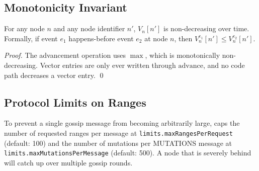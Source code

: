 \subsection{Monotonicity Invariant}

\begin{invariant}
\label{inv:mono-vv}
For any node $n$ and any node identifier $n'$, $V_n[n']$ is non-decreasing
over time. Formally, if event $e_1$ happens-before event $e_2$ at node $n$,
then $V_n^{e_1}[n'] \leq V_n^{e_2}[n']$.
\end{invariant}

\begin{proof}
The advancement operation uses $\max$, which is monotonically non-decreasing.
Vector entries are only ever written through $\mathrm{advance}$, and no code
path decreases a vector entry. \qed
\end{proof}

\subsection{Protocol Limits on Ranges}

To prevent a single gossip message from becoming arbitrarily large, \pebble{}
caps the number of requested ranges per message at
\texttt{limits.maxRangesPerRequest} (default: 100) and the number of mutations
per MUTATIONS message at \texttt{limits.maxMutationsPerMessage} (default: 500).
A node that is severely behind will catch up over multiple gossip rounds.
